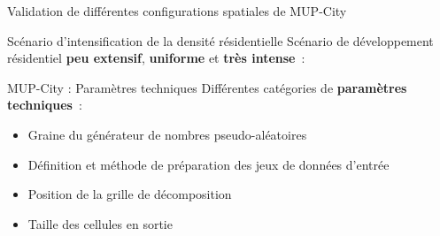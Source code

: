 \documentclass[xcolor=table]{beamer}
\begin{document}
\begin{frame}{Validation de différentes configurations spatiales de MUP-City}
{\begin{block}{Scénario d'intensification de la densité résidentielle}
	\vspace{0.4cm}
		{\footnotesize	Scénario de développement résidentiel \textbf{peu extensif}, \textbf{uniforme} et \textbf{très intense}~:}
		\begin{block}{}
		\end{block}
	\end{block}}
\end{frame}

\begin{frame}{MUP-City : Paramètres techniques}
	Différentes catégories de \textbf{paramètres techniques}~:\\
	\begin{itemize}
		\item Graine du générateur de nombres pseudo-aléatoires
		\item Définition et méthode de préparation des jeux de données d'entrée
		\item Position de la grille de décomposition
		\item Taille des cellules en sortie
	\end{itemize}
\end{frame}
\end{document}
